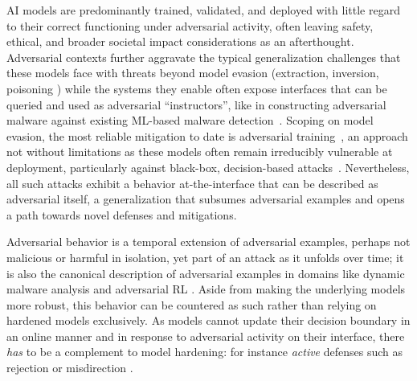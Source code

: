 

AI models are predominantly trained, validated, and deployed with little regard to their correct functioning under adversarial activity, often leaving safety, ethical, and broader societal impact considerations as an afterthought.
Adversarial contexts further aggravate the typical generalization challenges that these models face with threats beyond model evasion (extraction, inversion, poisoning \cite{he2020towards}) while the systems they enable often expose interfaces that can be queried and used as adversarial ``instructors'', like in constructing adversarial malware against existing ML-based malware detection~\cite{anderson2018learning, demetrio2021functionality}.
Scoping on model evasion, the most reliable mitigation to date is adversarial training~\cite{madry2017towards, wang2019convergence}, an approach not without limitations as these models often remain irreducibly vulnerable at deployment, particularly against black-box, decision-based attacks~\cite{brendel2018decision, chen2020hopskipjumpattack, yan2020policy}.
Nevertheless, all such attacks exhibit a behavior at-the-interface that can be described as adversarial itself, a generalization that subsumes adversarial examples and opens a path towards novel defenses and mitigations.

Adversarial behavior is a temporal extension of adversarial examples, perhaps not malicious or harmful in isolation, yet part of an attack as it unfolds over time; it is also the canonical description of adversarial examples in domains like dynamic malware analysis and adversarial RL \cite{tsingenopoulos2022adaptive, gleave2020adversarial}.
Aside from making the underlying models more robust, this behavior can be countered as such rather than relying on hardened models exclusively.
As models cannot update their decision boundary in an online manner and in response to adversarial activity on their interface, there \emph{has} to be a complement to model hardening: for instance \emph{active} defenses such as rejection or misdirection \cite{barbero2022transcending, sengupta2020multi, chen2020stateful}.

